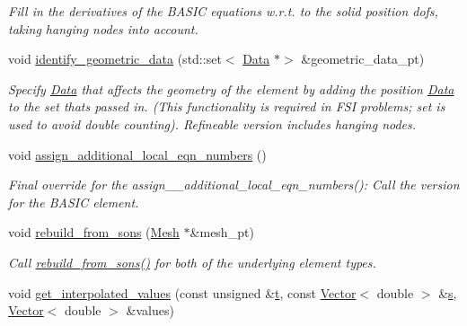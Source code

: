 \begin{DoxyCompactItemize}
\begin{DoxyCompactList}\small\item\em Fill in the derivatives of the B\+A\+S\+IC equations w.\+r.\+t. to the solid position dofs, taking hanging nodes into account. \end{DoxyCompactList}\item 
void \hyperlink{classoomph_1_1RefineablePseudoSolidNodeUpdateElement_a7f5152a1ad0e86b439330f92b989bb2a}{identify\+\_\+geometric\+\_\+data} (std\+::set$<$ \hyperlink{classoomph_1_1Data}{Data} $\ast$$>$ \&geometric\+\_\+data\+\_\+pt)
\begin{DoxyCompactList}\small\item\em Specify \hyperlink{classoomph_1_1Data}{Data} that affects the geometry of the element by adding the position \hyperlink{classoomph_1_1Data}{Data} to the set that\textquotesingle{}s passed in. (This functionality is required in F\+SI problems; set is used to avoid double counting). Refineable version includes hanging nodes. \end{DoxyCompactList}\item 
void \hyperlink{classoomph_1_1RefineablePseudoSolidNodeUpdateElement_aa6056e3f49ad76050543b1b11475d95f}{assign\+\_\+additional\+\_\+local\+\_\+eqn\+\_\+numbers} ()
\begin{DoxyCompactList}\small\item\em Final override for the assign\+\_\+\+\_\+additional\+\_\+local\+\_\+eqn\+\_\+numbers()\+: Call the version for the B\+A\+S\+IC element. \end{DoxyCompactList}\item 
void \hyperlink{classoomph_1_1RefineablePseudoSolidNodeUpdateElement_ac653ab28abf52506f54b1306272390ce}{rebuild\+\_\+from\+\_\+sons} (\hyperlink{classoomph_1_1Mesh}{Mesh} $\ast$\&mesh\+\_\+pt)
\begin{DoxyCompactList}\small\item\em Call \hyperlink{classoomph_1_1RefineablePseudoSolidNodeUpdateElement_ac653ab28abf52506f54b1306272390ce}{rebuild\+\_\+from\+\_\+sons()} for both of the underlying element types. \end{DoxyCompactList}\item 
void \hyperlink{classoomph_1_1RefineablePseudoSolidNodeUpdateElement_a0d92d0ec7145da660fdbf5f2a46814fd}{get\+\_\+interpolated\+\_\+values} (const unsigned \&\hyperlink{cfortran_8h_af6f0bd3dc13317f895c91323c25c2b8f}{t}, const \hyperlink{classoomph_1_1Vector}{Vector}$<$ double $>$ \&\hyperlink{cfortran_8h_ab7123126e4885ef647dd9c6e3807a21c}{s}, \hyperlink{classoomph_1_1Vector}{Vector}$<$ double $>$ \&values)
$$
\end{DoxyCompactItemize}
